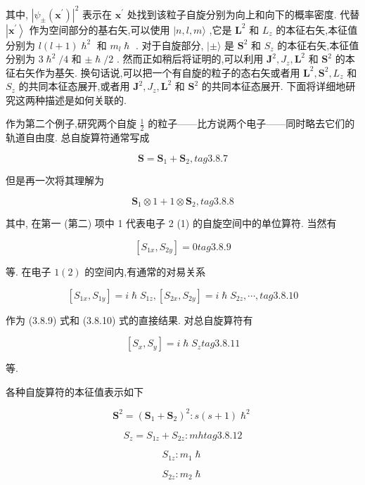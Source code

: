 其中, ${\left| {\psi }_{ \pm }\left( {\mathbf{x}}^{\prime }\right) \right| }^{2}$ 表示在 ${\mathbf{x}}^{\prime }$ 处找到该粒子自旋分别为向上和向下的概率密度. 代替 $\left| {\mathbf{x}}^{\prime }\right\rangle$ 作为空间部分的基右矢,可以使用 $|n, l, m\rangle$ ,它是 ${\mathbf{L}}^{2}$ 和 ${L}_{z}$ 的本征右矢,本征值分别为 $l\left( {l + 1}\right) {\hslash }^{2}$ 和 ${m}_{l}\hslash$ . 对于自旋部分, $| \pm \rangle$ 是 ${\mathbf{S}}^{2}$ 和 ${S}_{z}$ 的本征右矢,本征值分别为 $3{\hslash }^{2}/4$ 和 $\pm \hslash /2$ . 然而正如稍后将证明的,可以利用 ${\mathbf{J}}^{2},{J}_{z},{\mathbf{L}}^{2}$ 和 ${\mathbf{S}}^{2}$ 的本征右矢作为基矢. 换句话说,可以把一个有自旋的粒子的态右矢或者用 ${\mathbf{L}}^{2},{\mathbf{S}}^{2},{L}_{z}$ 和 ${S}_{z}$ 的共同本征态展开,或者用 ${\mathbf{J}}^{2},{J}_{z},{\mathbf{L}}^{2}$ 和 ${\mathbf{S}}^{2}$ 的共同本征态展开. 下面将详细地研究这两种描述是如何关联的.

作为第二个例子,研究两个自旋 $\frac{1}{2}$ 的粒子——比方说两个电子——同时略去它们的轨道自由度. 总自旋算符通常写成

$$
\mathbf{S} = {\mathbf{S}}_{1} + {\mathbf{S}}_{2}, tag{3.8.7}
$$

但是再一次将其理解为

$$
{\mathbf{S}}_{1} \otimes 1 + 1 \otimes {\mathbf{S}}_{2}, tag{3.8.8}
$$

其中, 在第一 (第二) 项中 1 代表电子 2 (1) 的自旋空间中的单位算符. 当然有

$$
\left\lbrack {{S}_{1x},{S}_{2y}}\right\rbrack = 0 tag{3.8.9}
$$

等. 在电子 $1\left( 2\right)$ 的空间内,有通常的对易关系

$$
\left\lbrack {{S}_{1x},{S}_{1y}}\right\rbrack = i\hslash {S}_{1z},\left\lbrack {{S}_{2x},{S}_{2y}}\right\rbrack = i\hslash {S}_{2z},\cdots , tag{3.8.10}
$$

作为 (3.8.9) 式和 (3.8.10) 式的直接结果. 对总自旋算符有

$$
\left\lbrack {{S}_{x},{S}_{y}}\right\rbrack = i\hslash {S}_{z} tag{3.8.11}
$$

等.

各种自旋算符的本征值表示如下

$$
{\mathbf{S}}^{2} = {\left( {\mathbf{S}}_{1} + {\mathbf{S}}_{2}\right) }^{2} : s\left( {s + 1}\right) {\hslash }^{2}
$$

$$
{S}_{z} = {S}_{1z} + {S}_{2z} : {mh} tag{3.8.12}
$$

$$
{S}_{1z} : {m}_{1}\hslash
$$

$$
{S}_{2z} : {m}_{2}\hslash
$$

